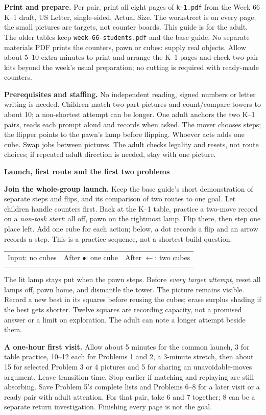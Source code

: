 \documentclass[11pt]{article}
\newcommand{\head}[1]{\par\textbf{\large #1}\par}
\newcommand{\demo}[2]{%
\begin{tikzpicture}[x=4.6mm,y=4.6mm,baseline=0pt]
\draw[gray] (-3,0)--(3,0);
\foreach \p in {-3,-2,...,3}{\draw[fill=white] (\p,0) circle (.23);}
\ifnum#1=1\fill (3,0) circle (.23);\fi
\node at (#2,.64) {$\blacktriangledown$};
\node[font=\scriptsize] at (0,-.62) {home};
\end{tikzpicture}}
\begin{document}
\textbf{Print and prepare.} Per pair, print all eight pages of \texttt{k-1.pdf} from the Week 66 K--1 draft, US Letter, single-sided, Actual Size. The workstreet is on every page; the small pictures are targets, not counter boards. This guide is for the adult. The older tables keep \texttt{week-66-students.pdf} and the base guide. No separate materials PDF prints the counters, pawn or cubes: supply real objects. Allow about 5--10 extra minutes to print and arrange the K--1 pages and check two pair kits beyond the week's usual preparation; no cutting is required with ready-made counters.

\textbf{Prerequisites and staffing.} No independent reading, signed numbers or letter writing is needed. Children match two-part pictures and count/compare towers to about 10; a non-shortest attempt can be longer. One adult anchors the two K--1 pairs, reads each prompt aloud and records when asked. The mover chooses steps; the flipper points to the pawn's lamp before flipping. Whoever acts adds one cube. Swap jobs between pictures. The adult checks legality and resets, not route choices; if repeated adult direction is needed, stay with one picture.
\newpage
\head{Launch, first route and the first two problems}
\textbf{Join the whole-group launch.} Keep the base guide's short demonstration of separate steps and flips, and its comparison of two routes to one goal. Let children handle counters first. Back at the K--1 table, practice a two-move record on a \emph{non-task start}: all off, pawn on the rightmost lamp. Flip there, then step one place left. Add one cube for each action; below, a dot records a flip and an arrow records a step. This is a practice sequence, not a shortest-build question.
\begin{center}
\begin{tabular}{c@{\quad}c@{\quad}c}
Input: no cubes & After $\bullet$: one cube & After $\leftarrow$: two cubes\\[3pt]
\demo{0}{3}&\demo{1}{3}&\demo{1}{2}
\end{tabular}
\end{center}
The lit lamp stays put when the pawn steps. Before \emph{every target attempt}, reset all lamps off, pawn home, and dismantle the tower. The picture remains visible. Record a new best in its squares before reusing the cubes; erase surplus shading if the best gets shorter. Twelve squares are recording capacity, not a promised answer or a limit on exploration. The adult can note a longer attempt beside them.

\textbf{A one-hour first visit.} Allow about 5 minutes for the common launch, 3 for table practice, 10--12 each for Problems 1 and 2, a 3-minute stretch, then about 15 for selected Problem 3 or 4 pictures and 5 for sharing an unavoidable-moves argument. Leave transition time. Stop earlier if matching and replaying are still absorbing. Save Problem 5's complete lists and Problems 6--8 for a later visit or a ready pair with adult attention. For that pair, take 6 and 7 together; 8 can be a separate return investigation. Finishing every page is not the goal.
\end{document}
